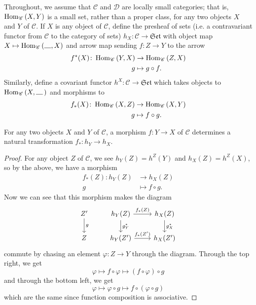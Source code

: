 \documentclass[dissertation.tex]{subfiles}
\begin{document}
Throughout, we assume that $\mathscr{C}$ and $\mathscr{D}$ are locally small categories; that is, $\operatorname{Hom}_{\mathscr{C}}\left(X,Y\right)$ is a small set, rather than a proper class, for any two objects $X$ and $Y$ of $\mathscr{C}$.
If $X$ is any object of $\mathscr{C}$, define the presheaf of sets (i.e. a contravariant functor from $\mathscr{C}$ to the category of sets) $h_X \colon \mathscr{C} \rightarrow \mathfrak{Set}$ with object map $X \mapsto \Hom{\mathscr{C}}{\line(1,0){10}, X}$ and arrow map sending $f : Z \rightarrow Y$ to the arrow
\begin{align*}
  f^*(X) \colon \operatorname{Hom}_{\mathscr{C}}\left(Y,X\right) &\rightarrow \operatorname{Hom}_{\mathscr{C}}\left(Z,X\right)\\
  g &\mapsto g \circ f.
\end{align*}
Similarly, define a covariant functor $h^X : \mathscr{C} \rightarrow \mathfrak{Set}$ which takes objects to $\Hom{\mathscr{C}}{X,\, \line(1,0){10}}$ and morphisms to
\begin{align*}
  f_*(X) \colon \operatorname{Hom}_{\mathscr{C}}\left(X,Z\right) &\rightarrow \operatorname{Hom}_{\mathscr{C}}\left(X,Y\right)\\
  g &\mapsto f \circ g.
\end{align*}

\begin{prop}\label{p.1}
  For any two objects $X$ and $Y$ of $\mathscr{C}$, a morphism $f : Y \rightarrow X$ of $\mathscr{C}$ determines a natural transformation $f_* : h_Y \rightarrow h_X$.
  
  \begin{proof}
    For any object $Z$ of $\mathscr{C}$, we see $h_Y(Z) = h^Z(Y)$ and $h_X(Z) = h^Z(X)$, so by the above, we have a morphism
    \begin{align*}
      f_*(Z) \colon h_Y(Z) &\rightarrow h_X(Z)\\
      g &\mapsto f \circ g.
    \end{align*}
    Now we can see that this morphism makes the diagram
    $$\begin{tikzcd}
      Z^\prime\arrow{d}{g} & h_Y(Z)\arrow{d}{g^*_Y}\arrow{r}{f_*(Z)} & h_X(Z)\arrow{d}{g^*_{X}}\\ 
      Z & h_Y(Z^\prime) \arrow{r}{f_*(Z^\prime)} &  h_X(Z^\prime)
    \end{tikzcd}$$
    commute by chasing an element $\varphi : Z \rightarrow Y$ through the diagram.
    Through the top right, we get
    $$\varphi \mapsto f \circ \varphi \mapsto (f \circ \varphi) \circ g $$
    and through the bottom left, we get
    $$\varphi \mapsto \varphi \circ g \mapsto f \circ (\varphi \circ g) $$
    which are the same since function composition is associative.
  \end{proof}
\end{prop}
\end{document}
